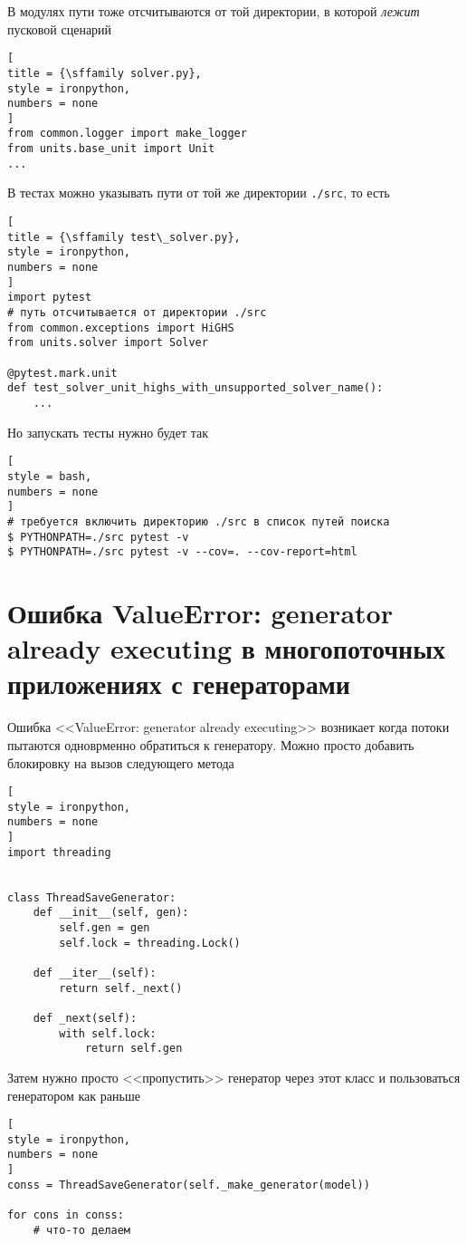 \documentclass[%
	11pt,
	a4paper,
	utf8,
		]{article}
\begin{document}
В модулях пути тоже отсчитываются от той директории, в которой \emph{лежит} пусковой сценарий
\begin{lstlisting}[
title = {\sffamily solver.py},
style = ironpython,
numbers = none
]
from common.logger import make_logger
from units.base_unit import Unit
...
\end{lstlisting}

В тестах можно указывать пути от той же директории \verb|./src|, то есть
\begin{lstlisting}[
title = {\sffamily test\_solver.py},
style = ironpython,
numbers = none
]
import pytest
# путь отсчитывается от директории ./src
from common.exceptions import HiGHS
from units.solver import Solver

@pytest.mark.unit
def test_solver_unit_highs_with_unsupported_solver_name():
    ...
\end{lstlisting}

Но запускать тесты нужно будет так
\begin{lstlisting}[
style = bash,
numbers = none
]
# требуется включить директорию ./src в список путей поиска
$ PYTHONPATH=./src pytest -v
$ PYTHONPATH=./src pytest -v --cov=. --cov-report=html
\end{lstlisting}

\section{Ошибка ValueError: generator already executing в многопоточных приложениях с генераторами}

Ошибка <<ValueError: generator already executing>> возникает когда потоки пытаются одноврменно обратиться к генератору. Можно просто добавить блокировку на вызов следующего метода
\begin{lstlisting}[
style = ironpython,
numbers = none
]
import threading


class ThreadSaveGenerator:
	def __init__(self, gen):
		self.gen = gen
		self.lock = threading.Lock()
	
	def __iter__(self):
		return self._next()
	
	def _next(self):
		with self.lock:
			return self.gen
\end{lstlisting}

Затем нужно просто <<пропустить>> генератор через этот класс и пользоваться генератором как раньше
\begin{lstlisting}[
style = ironpython,
numbers = none
]
conss = ThreadSaveGenerator(self._make_generator(model))

for cons in conss:
    # что-то делаем
\end{lstlisting}
\end{document}
